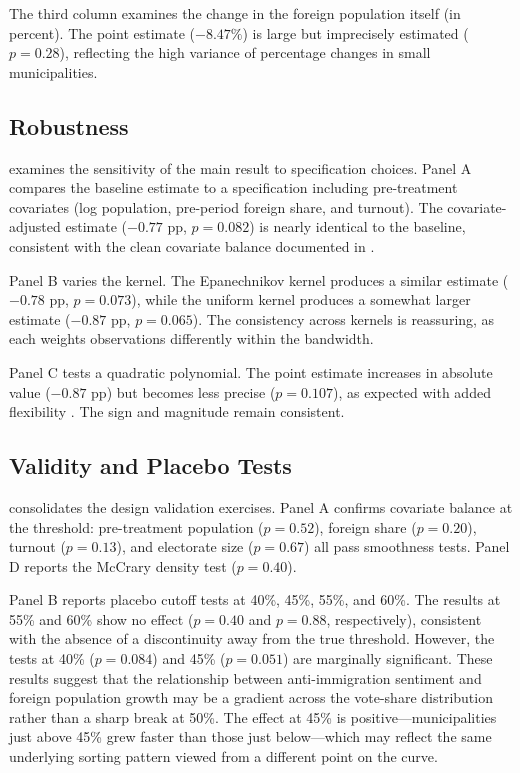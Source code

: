 \documentclass[12pt]{article}
\begin{document}
The third column examines the change in the foreign population itself (in percent). The point estimate ($-8.47\%$) is large but imprecisely estimated ($p = 0.28$), reflecting the high variance of percentage changes in small municipalities.



\subsection{Robustness}

 examines the sensitivity of the main result to specification choices. Panel A compares the baseline estimate to a specification including pre-treatment covariates (log population, pre-period foreign share, and turnout). The covariate-adjusted estimate ($-0.77$ pp, $p = 0.082$) is nearly identical to the baseline, consistent with the clean covariate balance documented in .

Panel B varies the kernel. The Epanechnikov kernel produces a similar estimate ($-0.78$ pp, $p = 0.073$), while the uniform kernel produces a somewhat larger estimate ($-0.87$ pp, $p = 0.065$). The consistency across kernels is reassuring, as each weights observations differently within the bandwidth.

Panel C tests a quadratic polynomial. The point estimate increases in absolute value ($-0.87$ pp) but becomes less precise ($p = 0.107$), as expected with added flexibility \citep{gelman2019}. The sign and magnitude remain consistent.



\subsection{Validity and Placebo Tests}

 consolidates the design validation exercises. Panel A confirms covariate balance at the threshold: pre-treatment population ($p = 0.52$), foreign share ($p = 0.20$), turnout ($p = 0.13$), and electorate size ($p = 0.67$) all pass smoothness tests. Panel D reports the McCrary density test ($p = 0.40$).

Panel B reports placebo cutoff tests at 40\%, 45\%, 55\%, and 60\%. The results at 55\% and 60\% show no effect ($p = 0.40$ and $p = 0.88$, respectively), consistent with the absence of a discontinuity away from the true threshold. However, the tests at 40\% ($p = 0.084$) and 45\% ($p = 0.051$) are marginally significant. These results suggest that the relationship between anti-immigration sentiment and foreign population growth may be a gradient across the vote-share distribution rather than a sharp break at 50\%. The effect at 45\% is positive---municipalities just above 45\% grew faster than those just below---which may reflect the same underlying sorting pattern viewed from a different point on the curve.
\end{document}
